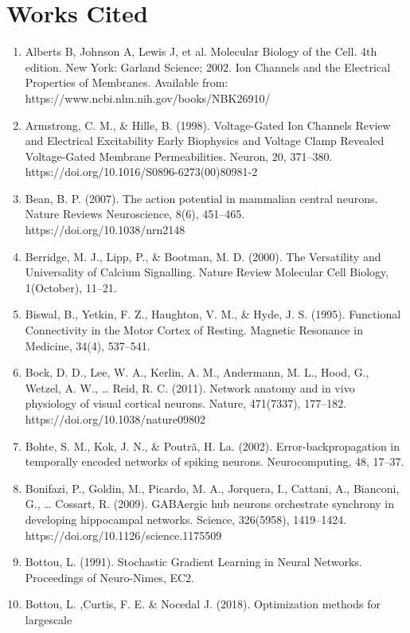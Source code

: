 \documentclass[11pt,titlepage]{article}
\begin{document}
\clearpage
\section{Works Cited}
%
%
\begin{spacing}{1}
\begin{enumerate}
\item Alberts B, Johnson A, Lewis J, et al. Molecular Biology of the Cell. 4th edition. New York: Garland Science; 2002. Ion Channels and the Electrical Properties of Membranes. Available from: https://www.ncbi.nlm.nih.gov/books/NBK26910/
\item Armstrong, C. M., \& Hille, B. (1998). Voltage-Gated Ion Channels Review and Electrical Excitability Early Biophysics and Voltage Clamp Revealed Voltage-Gated Membrane Permeabilities. Neuron, 20, 371–380.\\ https://doi.org/10.1016/S0896-6273(00)80981-2
\item Bean, B. P. (2007). The action potential in mammalian central neurons. Nature Reviews Neuroscience, 8(6), 451–465. https://doi.org/10.1038/nrn2148
\item Berridge, M. J., Lipp, P., \& Bootman, M. D. (2000). The Versatility and Universality of Calcium Signalling. Nature Review Molecular Cell Biology, 1(October), 11–21.
\item Biswal, B., Yetkin, F. Z., Haughton, V. M., \& Hyde, J. S. (1995). Functional Connectivity in the Motor Cortex of Resting. Magnetic Resonance in Medicine, 34(4), 537–541.
\item Bock, D. D., Lee, W. A., Kerlin, A. M., Andermann, M. L., Hood, G., Wetzel, A. W., … Reid, R. C. (2011). Network anatomy and in vivo physiology of visual cortical neurons. Nature, 471(7337), 177–182. https://doi.org/10.1038/nature09802
\item Bohte, S. M., Kok, J. N., \& Poutrã, H. La. (2002). Error-backpropagation in temporally encoded networks of spiking neurons. Neurocomputing, 48, 17–37.
\item Bonifazi, P., Goldin, M., Picardo, M. A., Jorquera, I., Cattani, A., Bianconi, G., … Cossart, R. (2009). GABAergic hub neurons orchestrate synchrony in developing hippocampal networks. Science, 326(5958), 1419–1424. https://doi.org/10.1126/science.1175509
\item Bottou, L. (1991). Stochastic Gradient Learning in Neural Networks. Proceedings of Neuro-Nimes, EC2.
\item Bottou, L. ,Curtis, F. E. \& Nocedal J. (2018). Optimization methods for largescale

\end{enumerate}
\end{spacing}
\end{document}
